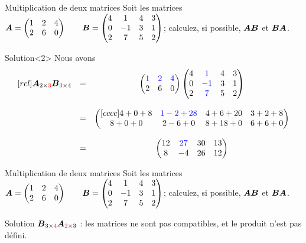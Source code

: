 \documentclass[french]{beamer}
\begin{document}
\begin{frame}{Multiplication de deux matrices}
Soit les matrices
$\displaystyle
\boldsymbol{A} = \begin{pmatrix}
	1 & 2 & 4 \\
	2 & 6 & 0
	\end{pmatrix}
\qquad
\boldsymbol{B} = \begin{pmatrix}
	4 & 1 & 4 & 3\\
	0 & -1 & 3 & 1 \\
	2 & 7 & 5 & 2
	\end{pmatrix}
$;
calculez, si possible, $\boldsymbol{A}\boldsymbol{B}$ et $\boldsymbol{B}\boldsymbol{A}$.

\begin{block}{Solution}<2>
Nous avons
\[
\begin{matrix}[rcl]
\boldsymbol{A}_{2\times\textcolor{red}{3}}\boldsymbol{B}_{\textcolor{red}{3}\times 4} & = & \begin{pmatrix}
	\textcolor{blue}{1} & \textcolor{blue}{2} & \textcolor{blue}{4} \\
	2 & 6 & 0
	\end{pmatrix}
	\begin{pmatrix}
	4 & \textcolor{blue}{1} & 4 & 3\\
	0 & \textcolor{blue}{-1} & 3 & 1 \\
	2 & \textcolor{blue}{7} & 5 & 2
	\end{pmatrix} \\
	\\
	&=& \begin{pmatrix}[cccc]
	4+0+8 & \textcolor{blue}{1-2+28} & 4+6+20 & 3 + 2 + 8 \\
	8+0+0 & 2-6+0 & 8+18+0 & 6+6+0
	\end{pmatrix}\\
	\\
	&=& \begin{pmatrix}
	12 & \textcolor{blue}{27} & 30 & 13 \\
	8 & -4 & 26 & 12
	\end{pmatrix}
	\end{matrix}
\]
\end{block}
\end{frame}

\begin{frame}{Multiplication de deux matrices}
Soit les matrices
$\displaystyle
\boldsymbol{A} = \begin{pmatrix}
	1 & 2 & 4 \\
	2 & 6 & 0
	\end{pmatrix}
\qquad
\boldsymbol{B} = \begin{pmatrix}
	4 & 1 & 4 & 3\\
	0 & -1 & 3 & 1 \\
	2 & 7 & 5 & 2
	\end{pmatrix}
$;
calculez, si possible, $\boldsymbol{A}\boldsymbol{B}$ et $\boldsymbol{B}\boldsymbol{A}$.

\begin{block}{Solution}
$
\boldsymbol{B}_{3\times \textcolor{red}{4}}\boldsymbol{A}_{\textcolor{red}{2}\times3}$ : les matrices ne sont 
pas compatibles, et le produit n'est pas défini.
\end{block}
\end{frame}
\end{document}
